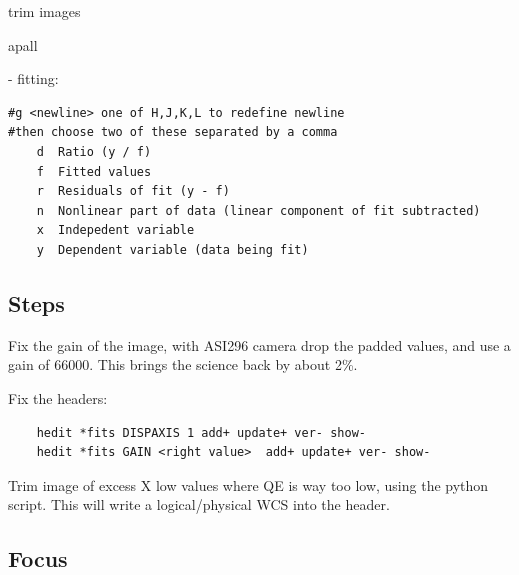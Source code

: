 trim images


apall

- fitting:

\begingroup \fontsize{10pt}{10pt}
\selectfont
\begin{verbatim} 
#g <newline> one of H,J,K,L to redefine newline
#then choose two of these separated by a comma
    d  Ratio (y / f)
    f  Fitted values
    r  Residuals of fit (y - f)
    n  Nonlinear part of data (linear component of fit subtracted)
    x  Indepedent variable
    y  Dependent variable (data being fit)
\end{verbatim}
\endgroup


\subsection{Steps}

Fix the gain of the image, with ASI296 camera drop the padded
values, and use a gain of 66000. This brings the science back
by about 2\%.

Fix the headers:


\begingroup \fontsize{10pt}{10pt}
\selectfont
\begin{verbatim} 
    hedit *fits DISPAXIS 1 add+ update+ ver- show-
    hedit *fits GAIN <right value>  add+ update+ ver- show-
\end{verbatim}
\endgroup


Trim image of excess X low values where QE is way too low, using the
python script. This will write a logical/physical WCS into the header.

\subsection{Focus}

